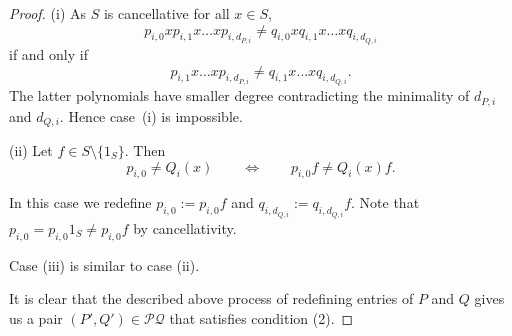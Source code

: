 \documentclass[11pt]{amsart}
\makeatletter
\newtheorem{lemma}[theorem]{Lemma}
\theoremstyle{definition}
\newcommand{\N}{\mathbb N}
\newcommand{\Sym}{\operatorname{Sym}}
\newcommand{\makeset}[2]{\left\lbrace #1 \;\middle|\;
 \begin{tabular}{@{}l@{}}
   #2
  \end{tabular}
  \right\rbrace}
\makeatother
\begin{document}
\begin{proof}
(i) As \(S\) is cancellative for all \(x\in S\),
\[p_{i,0}xp_{i, 1}x \ldots xp_{i, d_{P,i}} \neq q_{i,0}xq_{i, 1}x \ldots xq_{i, d_{Q,i}}\]
if and only if 
\[p_{i, 1}x \ldots xp_{i, d_{P,i}} \neq q_{i, 1}x \ldots xq_{i, d_{Q,i}}.\]
The latter polynomials have smaller degree contradicting the minimality of \(d_{P,i}\) and \(d_{Q,i}\). Hence case~(i) is impossible.

(ii) Let \(f\in S\setminus \{1_{S}\}\).
Then
\[p_{i, 0} \neq Q_{i}(x)\qquad \iff \qquad p_{i, 0}f \neq Q_{i}(x)f.\]

In this case we redefine \(p_{i, 0}:= 
p_{i, 0}f\) and \(q_{i, d_{Q,i}}:= q_{i, d_{Q,i}}f\). 
Note that \(p_{i,0}=p_{i, 0}1_S\neq p_{i, 0}f\) by cancellativity.

Case (iii) is similar to case (ii).

It is clear that the described above process of redefining entries of $P$ and $Q$ gives us a pair $(P',Q')\in\mathcal{PQ}$ that satisfies condition (2).
\end{proof}

    
\end{document}
